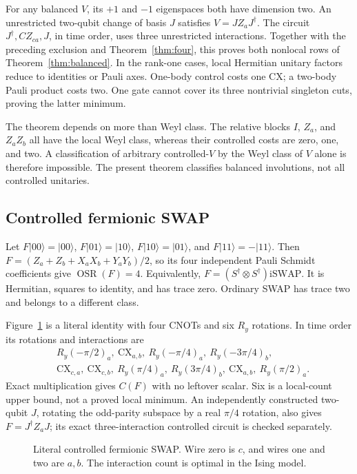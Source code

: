 \documentclass[a4paper,onecolumn,11pt,unpublished]{quantumarticle}
\newcommand{\OSR}{\operatorname{OSR}}
\newcommand{\CNOT}{\mathrm{CX}}
\begin{document}
For any balanced $V$, its $+1$ and $-1$ eigenspaces both have dimension two.
An unrestricted two-qubit change of basis $J$ satisfies
$V=JZ_aJ^\dagger$. The circuit $J^\dagger,CZ_{ca},J$, in time order,
uses three unrestricted interactions. Together with the preceding exclusion
and Theorem~\ref{thm:four}, this proves both nonlocal rows of
Theorem~\ref{thm:balanced}. In the rank-one cases, local Hermitian unitary
factors reduce to identities or Pauli axes. One-body control costs one CX;
a two-body Pauli product costs two. One gate cannot cover its three
nontrivial singleton cuts, proving the latter minimum.

The theorem depends on more than Weyl class. The relative blocks $I$,
$Z_a$, and $Z_aZ_b$ all have the local Weyl class, whereas their controlled
costs are zero, one, and two. A classification of arbitrary controlled-$V$
by the Weyl class of $V$ alone is therefore impossible. The present theorem
classifies balanced involutions, not all controlled unitaries.

\subsection{Controlled fermionic SWAP}\label{sec:fermionic}
Let $F|00\rangle=|00\rangle$, $F|01\rangle=|10\rangle$,
$F|10\rangle=|01\rangle$, and $F|11\rangle=-|11\rangle$.
Then $F=(Z_a+Z_b+X_aX_b+Y_aY_b)/2$, so its four independent Pauli
Schmidt coefficients give $\OSR(F)=4$. Equivalently,
$F=(S^\dagger\otimes S^\dagger)\mathrm{iSWAP}$.
It is Hermitian, squares to identity, and has trace zero. Ordinary SWAP
has trace two and belongs to a different class.

Figure~\ref{fig:fermionic} is a literal identity with four CNOTs and six
$R_y$ rotations. In time order its rotations and interactions are
\begin{align*}
 &R_y(-\pi/2)_a,\ \CNOT_{a,b},\ R_y(-\pi/4)_a,\ R_y(-3\pi/4)_b,\\
 &\CNOT_{c,a},\ \CNOT_{c,b},\ R_y(\pi/4)_a,\ R_y(3\pi/4)_b,
 \ \CNOT_{a,b},\ R_y(\pi/2)_a.
\end{align*}
Exact multiplication gives $C(F)$ with no leftover scalar. Six is a
local-count upper bound, not a proved local minimum. An independently
constructed two-qubit $J$, rotating the odd-parity subspace by a real
$\pi/4$ rotation, also gives $F=J^\dagger Z_aJ$; its exact three-interaction
controlled circuit is checked separately.
\begin{figure}[ht]
\centering\resizebox{\linewidth}{!}{}
\caption{Literal controlled fermionic SWAP. Wire zero is $c$, and wires
one and two are $a,b$. The interaction count is optimal in the Ising model.}
\label{fig:fermionic}
\end{figure}
\end{document}
